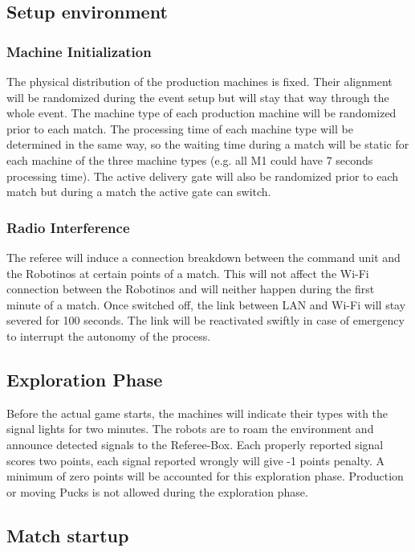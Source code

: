 \documentclass[12pt,twoside]{article}
\begin{document}
\subsection{Setup environment}
\subsubsection{Machine Initialization}

The physical distribution of the production machines is fixed. Their
alignment will be randomized during the event setup but will stay that
way through the whole event. The machine type of each production
machine will be randomized prior to each match. The processing time of
each machine type will be determined in the same way, so the waiting
time during a match will be static for each machine of the three
machine types (e.g. all M1 could have 7 seconds processing time). The
active delivery gate will also be randomized prior to each match but
during a match the active gate can switch.


\subsubsection{Radio Interference}
\label{sec:radio-interference}
The referee will induce a connection breakdown between the command
unit and the Robotinos at certain points of a match. This will not
affect the Wi-Fi connection between the Robotinos and will neither
happen during the first minute of a match. Once switched off, the link
between LAN and Wi-Fi will stay severed for 100 seconds. The link will
be reactivated swiftly in case of emergency to interrupt the autonomy
of the process.


\subsection{Exploration Phase}
Before the actual game starts, the machines will indicate their types with the
signal lights for two minutes. The robots are to roam the environment and
announce detected signals to the Referee-Box. Each properly reported signal
scores two points, each signal reported wrongly will give -1 points penalty.
A minimum of zero points will be accounted for this exploration phase.
Production or moving Pucks is not allowed during the exploration phase.

\subsection{Match startup}
\end{document}
